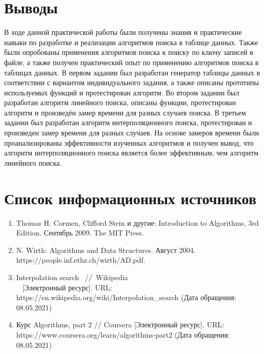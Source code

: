 \documentclass[a4paper, 14pt]{extarticle}
\begin{document}
\section*{Выводы}
В ходе данной практической работы были получены знания и практические навыки
по разработке и реализации алгоритмов поиска в таблице данных.
Также были опробованы применения алгоритмов поиска к поиску по ключу
записей в файле, а также получен практический опыт по применению
алгоритмов поиска в таблицах данных. В первом
задании был разработан генератор таблицы данных в соответствии с вариантом
индивидуального задания, а также описаны прототипы используемых функций и
протестирован алгоритм. Во втором задании был разработан алгоритм линейного
поиска, описаны функции, протестирован алгоритм и произведён замер времени для
разных случаев поиска. В третьем задании был разработан алгоритм интерполяционного поиска,
протестирован и произведен замер времени для разных случаев. На основе замеров
времени были проанализированы эффективности изученных алгоритмов и получен вывод, %
что алгоритм интерполяционного поиска является более эффективным, чем алгоритм
линейного поиска.
\section*{Список информационных источников}
\begin{enumerate}[leftmargin=*]
  \item Thomas H. Cormen, Clifford Stein и другие: Introduction to Algorithms, 3rd Edition.
    Сентябрь 2009. The MIT Press.
  \item N. Wirth: Algorithms and Data Structures. Август 2004.
    \\ https://people.inf.ethz.ch/wirth/AD.pdf.
  \item Interpolation search ~//~Wikipedia \\~
    [Электронный ресурс]. URL:
    \\ https://en.wikipedia.org/wiki/Interpolation\_search
    (Дата обращения: 08.05.2021)
   \item Курс Algorithms, part 2 // Coursera [Электронный ресурс]. URL:
     \\ https://www.coursera.org/learn/algorithms-part2
     (Дата обращения: 08.05.2021)
\end{enumerate}
\end{document}
